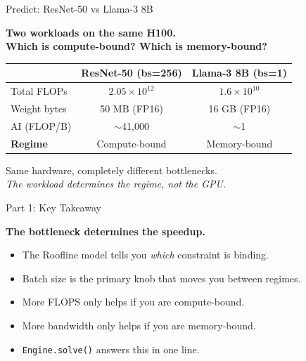 \documentclass[aspectratio=169, 12pt]{beamer}
\begin{document}
\begin{frame}[shrink]{Predict: ResNet-50 vs Llama-3 8B}

\centering
\Large\bfseries
Two workloads on the same H100.\\[0.3cm]
\normalsize
Which is compute-bound? Which is memory-bound?\\[0.5cm]

\pause

\small
\begin{tabular}{lcc}
\toprule
              & \textbf{ResNet-50 (bs=256)} & \textbf{Llama-3 8B (bs=1)} \\
\midrule
Total FLOPs   & $2.05 \times 10^{12}$       & $1.6 \times 10^{10}$ \\
Weight bytes   & 50 MB (FP16)               & 16 GB (FP16) \\
AI (FLOP/B)   & $\sim$41{,}000              & $\sim$1 \\
\midrule
\textbf{Regime} & \colorbox{computeblue}{Compute-bound} & \colorbox{datagreen}{Memory-bound} \\
\bottomrule
\end{tabular}

\vspace{0.3cm}
\pause
\alert{Same hardware, completely different bottlenecks.}\\
\textit{The workload determines the regime, not the GPU.}
\end{frame}

\begin{frame}[shrink]{Part 1: Key Takeaway}

\centering\Large

\textbf{The bottleneck determines the speedup.}\\[0.5cm]

\normalsize
\begin{itemize}
  \item The Roofline model tells you \textit{which} constraint is binding.
  \item Batch size is the primary knob that moves you between regimes.
  \item More FLOPS only helps if you are compute-bound.
  \item More bandwidth only helps if you are memory-bound.
  \item \texttt{Engine.solve()} answers this in one line.
\end{itemize}
\end{frame}
\end{document}
